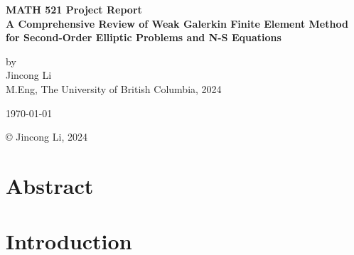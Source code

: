 \documentclass[12pt]{article} %
\begin{document}
\setlength{\parskip}{1em} 
\setlength{\parindent}{0pt}
\newcommand{\vect}[1]{\mathbf{#1}}

\begin{titlepage}  %
    \centering    %

    \vspace*{2cm}
    
    \normalsize \textbf{MATH 521 Project Report} \\
    \vspace{0.5cm}  %
    \normalsize\textbf{A Comprehensive Review of Weak Galerkin Finite Element Method for Second-Order Elliptic Problems and N-S Equations} \\
    \vspace{2cm}  %
    
    \normalsize by\\
    \vspace{1cm}
    \normalsize Jincong Li \\ 
    \vspace{1cm}
    \normalsize M.Eng, The University of British Columbia, 2024
    \vspace{11cm}  %
    
    \normalsize \today

    \vfill  %
    © Jincong Li, 2024
\end{titlepage}
\tableofcontents
\newpage
\section{Abstract}
\section{Introduction}
\end{document}
